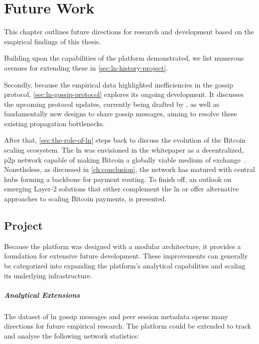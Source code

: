 \chapter{Future Work}
\label{ch:future-work}

This chapter outlines future directions for research and development 
based on the empirical findings of this thesis. 

Building upon the capabilities of the  platform demonstrated, 
we list numerous avenues for extending these in \autoref{sec:ln-history-project}.

Secondly, because the empirical data highlighted inefficiencies in the gossip protocol, 
\autoref{sec:ln-gossip-protocol} explores its ongoing development. 
It discusses the upcoming  protocol updates, 
currently being drafted by \citeauthor{lightningdevelopers_bolts_2018}, 
as well as fundamentally new designs to share gossip messages,
aiming to resolve these existing propagation bottlenecks.

After that, \autoref{sec:the-role-of-ln} steps back to discuss the evolution of the Bitcoin scaling ecosystem.
The \gls{ln} was envisioned in the whitepaper  as a decentralized, 
\gls{p2p} network capable of making Bitcoin a globally viable medium of exchange~\cite{poon_bitcoin_2016}. 
Nonetheless, as discussed in \autoref{ch:conclusion}, 
the network has matured with central hubs forming a backbone for payment routing.
To finish off, an outlook on emerging Layer-2 solutions that either complement the \gls{ln} or 
offer alternative approaches to scaling Bitcoin payments, is presented.


\section{ Project}
\label{sec:ln-history-project}

Because the  platform was designed with a modular architecture, 
it provides a foundation for extensive future development. 
These improvements can generally be categorized into expanding the platform's 
analytical capabilities and scaling its underlying infrastructure.

\paragraph{Analytical Extensions}

The dataset of \gls{ln} gossip messages and peer session metadata opens
many directions for future empirical research. 
The platform could be extended to track and analyse the following network statistics:

